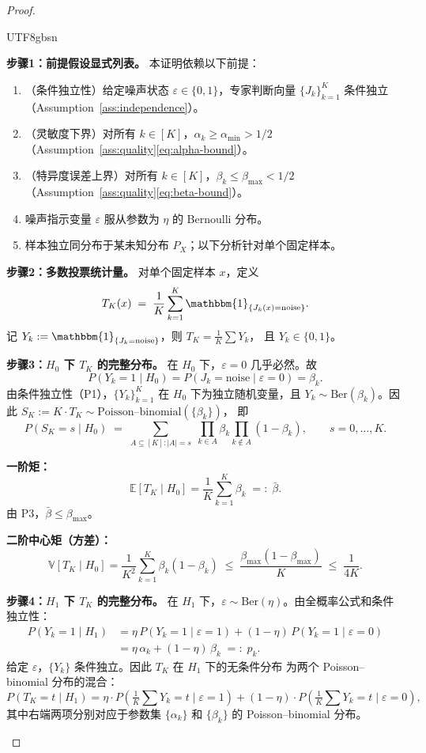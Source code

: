 \documentclass[12pt,a4paper]{article}
\newenvironment{chinese}{\begin{CJK}{UTF8}{gbsn}}{\end{CJK}}
\newcommand{\E}{\mathbb{E}}
\newcommand{\V}{\mathbb{V}}
\newcommand{\Ber}{\mathrm{Ber}}
\begin{document}
\begin{proof}
\begin{chinese}

\textbf{步骤1：前提假设显式列表。}
本证明依赖以下前提：
\begin{enumerate}[label=(\textbf{P\arabic*})]
    \item （条件独立性）给定噪声状态 $\varepsilon\in\{0,1\}$，专家判断向量
          $\{J_k\}_{k=1}^{K}$ 条件独立（Assumption~\ref{ass:independence}）。
    \item （灵敏度下界）对所有 $k\in[K]$，$\alpha_k\geq\alpha_{\min}>1/2$
          （Assumption~\ref{ass:quality}\eqref{eq:alpha-bound}）。
    \item （特异度误差上界）对所有 $k\in[K]$，$\beta_k\leq\beta_{\max}<1/2$
          （Assumption~\ref{ass:quality}\eqref{eq:beta-bound}）。
    \item 噪声指示变量 $\varepsilon$ 服从参数为 $\eta$ 的 Bernoulli 分布。
    \item 样本独立同分布于某未知分布 $P_X$；以下分析针对单个固定样本。
\end{enumerate}

\textbf{步骤2：多数投票统计量。}
对单个固定样本 $x$，定义
\begin{equation}\label{eq:TK-def}
    T_K(x) \;=\; \frac{1}{K}\sum_{k=1}^{K} \mathbbm{1}_{\{J_k(x)=\mathrm{noise}\}}.
\end{equation}
记 $Y_k := \mathbbm{1}_{\{J_k=\mathrm{noise}\}}$，则 $T_K = \frac1K\sum Y_k$，
且 $Y_k\in\{0,1\}$。

\textbf{步骤3：$H_0$ 下 $T_K$ 的完整分布。}
在 $H_0$ 下，$\varepsilon=0$ 几乎必然。故
\[
P(Y_k=1\mid H_0) = P(J_k=\mathrm{noise}\mid\varepsilon=0) = \beta_k.
\]
由条件独立性（P1），$\{Y_k\}_{k=1}^{K}$ 在 $H_0$ 下为独立随机变量，且
$Y_k\sim\Ber(\beta_k)$。因此 $S_K := K\cdot T_K \sim \text{Poisson--binomial}(\{\beta_k\})$，
即
\[
P(S_K = s \mid H_0) \;=\; \sum_{A\subseteq[K]:|A|=s}\; \prod_{k\in A}\beta_k \prod_{k\notin A}(1-\beta_k),
\qquad s=0,\dots,K.
\]

\textbf{一阶矩：}
\[
\E[T_K\mid H_0] = \frac{1}{K}\sum_{k=1}^{K} \beta_k \;=:\; \bar{\beta}.
\]
由 P3，$\bar{\beta}\leq\beta_{\max}$。

\textbf{二阶中心矩（方差）：}
\[
\V[T_K \mid H_0] = \frac{1}{K^{2}}\sum_{k=1}^{K} \beta_k(1-\beta_k)
\;\leq\; \frac{\beta_{\max}(1-\beta_{\max})}{K}
\;\leq\; \frac{1}{4K}.
\]

\textbf{步骤4：$H_1$ 下 $T_K$ 的完整分布。}
在 $H_1$ 下，$\varepsilon\sim\Ber(\eta)$。由全概率公式和条件独立性：
\begin{align*}
    P(Y_k=1\mid H_1)
    &= \eta\,P(Y_k=1\mid\varepsilon=1) + (1-\eta)\,P(Y_k=1\mid\varepsilon=0) \\
    &= \eta\,\alpha_k + (1-\eta)\,\beta_k \;=:\; p_k.
\end{align*}
给定 $\varepsilon$，$\{Y_k\}$ 条件独立。因此 $T_K$ 在 $H_1$ 下的无条件分布
为两个 Poisson--binomial 分布的混合：
\[
P(T_K = t \mid H_1) = \eta\cdot P\!\left(\tfrac1K\sum Y_k = t \;\big|\; \varepsilon=1\right)
+ (1-\eta)\cdot P\!\left(\tfrac1K\sum Y_k = t \;\big|\; \varepsilon=0\right),
\]
其中右端两项分别对应于参数集 $\{\alpha_k\}$ 和 $\{\beta_k\}$ 的
Poisson--binomial 分布。


\end{chinese}
\end{proof}
\end{document}
